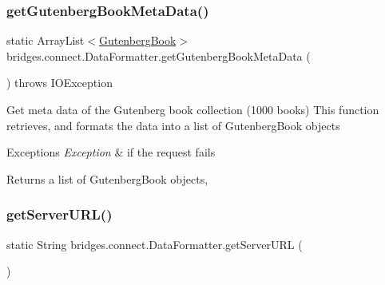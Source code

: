 \subsubsection{\texorpdfstring{get\+Gutenberg\+Book\+Meta\+Data()}{getGutenbergBookMetaData()}}
{\footnotesize\ttfamily static Array\+List$<$\hyperlink{classbridges_1_1data__src__dependent_1_1_gutenberg_book}{Gutenberg\+Book}$>$ bridges.\+connect.\+Data\+Formatter.\+get\+Gutenberg\+Book\+Meta\+Data (\begin{DoxyParamCaption}{ }\end{DoxyParamCaption}) throws I\+O\+Exception\hspace{0.3cm}{\ttfamily [static]}}

Get meta data of the Gutenberg book collection (1000 books) This function retrieves, and formats the data into a list of Gutenberg\+Book objects


\begin{DoxyExceptions}{Exceptions}
{\em Exception} & if the request fails\\
\hline
\end{DoxyExceptions}
\begin{DoxyReturn}{Returns}
a list of Gutenberg\+Book objects, 
\end{DoxyReturn}
\mbox{\label{classbridges_1_1connect_1_1_data_formatter_a4abc8f8b0970d6c07c680ac485e299c7}} 
\subsubsection{\texorpdfstring{get\+Server\+U\+R\+L()}{getServerURL()}}
{\footnotesize\ttfamily static String bridges.\+connect.\+Data\+Formatter.\+get\+Server\+U\+RL (\begin{DoxyParamCaption}{ }\end{DoxyParamCaption})\hspace{0.3cm}{\ttfamily [static]}}

\mbox{\label{classbridges_1_1connect_1_1_data_formatter_ac090a4d67b38b9649bf811906f9a630a}} 
